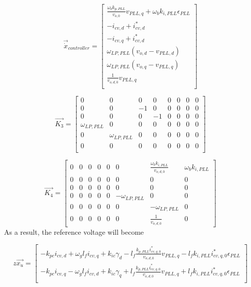\begin{equation}
 \Vec{\dot{x}}_{controller}=
 \begin{bmatrix}
 \frac{\omega_b k_{p,PLL}}{v_{o,0}} v_{PLL, q} + \omega_b k_{i,PLL} \epsilon_{PLL}\\
 - i_{cv,d} + i_{cv,d}^* \\
 - i_{cv,q} + i_{cv,d}^* \\
 \omega_{LP,PLL}(v_{o,d} - v_{PLL,d})\\
 \omega_{LP,PLL}(v_{o,q} - v_{PLL,q})\\
 \frac{1}{v_{o,d,0} }v_{PLL,q}\\
 \end{bmatrix}{}
\end{equation}{}

\begin{equation}
 \Vec{K_3} = 
 \begin{bmatrix}
 0 &0&0&0 &0 &0&0&0\\
 0 & 0 & -1&0 &0&0&0&0\\
 0 & 0 & 0 & -1& 0 &0&0&0\\
 \omega_{LP, PLL} & 0 & 0&0 &0&0&0&0\\
 0 & \omega_{LP, PLL} &0 &0&0&0&0&0\\
 0 &0&0&0&0 &0&0&0\\
 \end{bmatrix}{}
\end{equation}{}

\begin{equation}
 \Vec{K_4} = 
 \begin{bmatrix}
 0 &0&0&0 &0 &0&\frac{\omega_b k_{i,PLL}}{v_{o,d,0}}&\omega_b k_{i,PLL}\\
 0&0&0&0&0&0&0&0\\
 0&0&0&0&0&0&0&0\\
 0 & 0 & 0&0 &0&-\omega_{LP, PLL}&0&0\\
 0 & 0&0 & 0&0 &0&-\omega_{LP, PLL}&0\\
 0 & 0 &0 &0&0&0&\frac{1}{v_{o,d,0}}&0
 \end{bmatrix}{}
 \end{equation}{}
As a result, the reference voltage will become


\begin{equation}
 z\Vec{x_u}= 
 \begin{bmatrix}
 -k_{pc} i_{cv,d} + \omega_g l_f i_{cv,q} + k_{ic} \gamma_d 
 -l_f \frac{k_{p,PLL}i^*_{cv,q,0}}{v_{o,d,0}} v_{PLL, q} - l_f k_{i,PLL} i_{cv,q,0}^* \epsilon_{PLL } \\
 -k_{pc} i_{cv,q} - \omega_g l_f i_{cv,d} +k_{ic} \gamma_q +
 l_f \frac{k_{p,PLL}i^*_{cv,q,0}}{v_{o,d,0}} v_{PLL, q} + l_f k_{i,PLL} i_{cv,q,0}^* \epsilon_{PLL }\\
 \end{bmatrix}{}
\end{equation}{}

